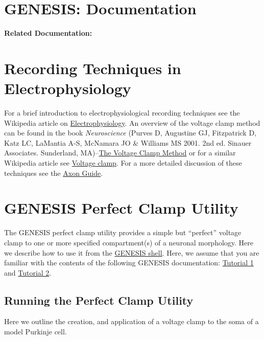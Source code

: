 \documentclass[12pt]{article}
\begin{document}
\section*{GENESIS: Documentation}

{\bf Related Documentation:}

\section*{Recording Techniques in Electrophysiology}

For a brief introduction to electrophysiological recording techniques see the Wikipedia article on \href{http://en.wikipedia.org/wiki/Electrophysiology#Current_clamp}{Electrophysiology}. An overview of the voltage clamp method can be found in the book {\it Neuroscience} (Purves D, Augustine GJ,  Fitzpatrick D, Katz LC, LaMantia A-S, McNamara JO \& Williams MS 2001. 2nd ed. Sinauer Associates. Sunderland, MA)--\href{http://www.ncbi.nlm.nih.gov/bookshelf/br.fcgi?book=neurosci&part=A174}{The Voltage Clamp Method} or for a similar Wikipedia article see \href{http://en.wikipedia.org/wiki/Voltage_clamp}{Voltage clamp}. For a more detailed discussion of these techniques see the \href{http://www.moleculardevices.com/pages/instruments/axon_guide.html}{Axon Guide}.

\section*{GENESIS Perfect Clamp Utility}

The GENESIS perfect clamp utility provides a simple but ``perfect'' voltage clamp to one or more specified compartment(s) of a neuronal morphology. Here we describe how to use it from the \href{../gshell/gshell.tex}{GENESIS shell}. Here, we assume that you are familiar with the contents of the following GENESIS documentation: \href{../tutorial1/tutorial1.tex}{Tutorial 1} and \href{../tutorial2/tutorial2.tex}{Tutorial 2}.

\subsection*{Running the Perfect Clamp Utility}

Here we outline the creation, and application of a voltage clamp to the soma of a model Purkinje cell.
\end{document}
